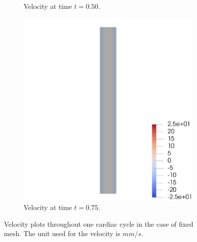 \documentclass[a4paper,11pt,openright,twoside]{book}
\begin{document}
\begin{figure}[h!]
\begin{subfigure}[b]{0.5\linewidth}
        \centering
    \caption{Velocity at time $t = 0.50$.} 
    \label{fig1:c} 
  \end{subfigure}%
  \begin{subfigure}[b]{0.5\linewidth}
    \centering
    \includegraphics[width=1.2\linewidth]{images/velocity_fixed_075.png} 
        \centering
    \caption{Velocity at time $t = 0.75$.} 
    \label{fig1:d} 
  \end{subfigure} 
  \centering
  \caption{Velocity plots throughout one cardiac cycle in the case of fixed mesh. The unit used for the velocity is $mm/s$.}
  \label{fig1} 
\end{figure}
\end{document}
